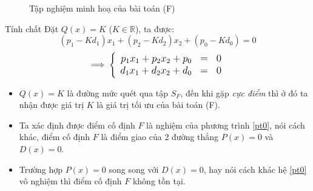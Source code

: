 \documentclass{beamer}
\begin{document}
\begin{frame}
\begin{figure}
    \caption{Tập nghiệm minh hoạ của bài toán (F)}
    \end{figure}
\end{frame}
\begin{frame}{Tính chất}
Đặt $Q(x)=K$ ($K \in \mathbb{R}$), ta được:
\begin{equation} \label{pt0}
(p_1-Kd_1)x_1+(p_2-Kd_2)x_2+(p_0-Kd_0) = 0
\end{equation}
\begin{equation} \label{pt1}
\implies
\left\{ \large
\begin{array}{rcr}
p_1x_1+p_2x_2+p_0 &=& 0 \\
d_1x_1+d_2x_2+d_0 &=& 0 \\
\end{array}
\right.
\end{equation}
\begin{itemize}
\item $Q(x)=K$ là đường mức quét qua tập $S_F$, đến khi gặp \textsl{cực điểm} thì ở đó ta nhận được giá trị $K$ là giá trị tối ưu của bài toán (F).
\item Ta xác định được điểm cố định $F$ là nghiệm của phương trình \eqref{pt0}, nói cách khác, điểm cố định $F$ là điểm giao của 2 đường thẳng $P(x)=0$ và $D(x)=0$.
\item Trường hợp $P(x)=0$ song song với $D(x)=0$, hay nói cách khác hệ \eqref{pt0} vô nghiệm thì điểm cố định $F$ không tồn tại.
\end{itemize}
\end{frame}
\end{document}
